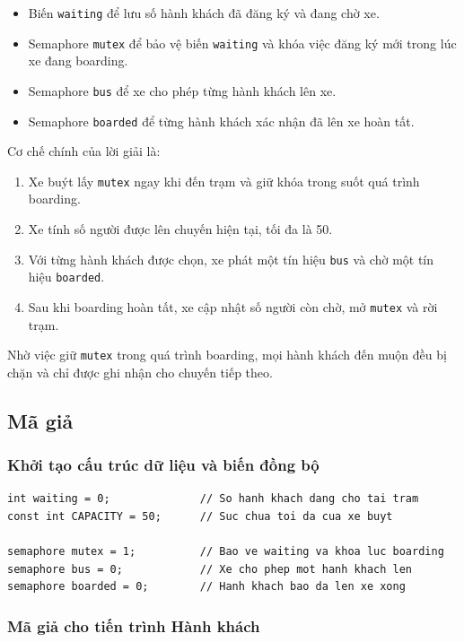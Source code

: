 \begin{itemize}
\item Biến \texttt{waiting} để lưu số hành khách đã đăng ký và đang
chờ xe.
\item Semaphore \texttt{mutex} để bảo vệ biến \texttt{waiting} và
khóa việc đăng ký mới trong lúc xe đang boarding.
\item Semaphore \texttt{bus} để xe cho phép từng hành khách lên xe.
\item Semaphore \texttt{boarded} để từng hành khách xác nhận đã lên
xe hoàn tất.
\end{itemize}

Cơ chế chính của lời giải là:

\begin{enumerate}
\item Xe buýt lấy \texttt{mutex} ngay khi đến trạm và giữ khóa trong
suốt quá trình boarding.
\item Xe tính số người được lên chuyến hiện tại, tối đa là 50.
\item Với từng hành khách được chọn, xe phát một tín hiệu
\texttt{bus} và chờ một tín hiệu \texttt{boarded}.
\item Sau khi boarding hoàn tất, xe cập nhật số người còn chờ, mở
\texttt{mutex} và rời trạm.
\end{enumerate}

Nhờ việc giữ \texttt{mutex} trong quá trình boarding, mọi hành khách đến
muộn đều bị chặn và chỉ được ghi nhận cho chuyến tiếp theo.

\subsection{Mã giả}

\subsubsection*{Khởi tạo cấu trúc dữ liệu và biến đồng bộ}

\begin{lstlisting}
int waiting = 0;              // So hanh khach dang cho tai tram
const int CAPACITY = 50;      // Suc chua toi da cua xe buyt

semaphore mutex = 1;          // Bao ve waiting va khoa luc boarding
semaphore bus = 0;            // Xe cho phep mot hanh khach len
semaphore boarded = 0;        // Hanh khach bao da len xe xong
\end{lstlisting}

\subsubsection*{Mã giả cho tiến trình Hành khách}

